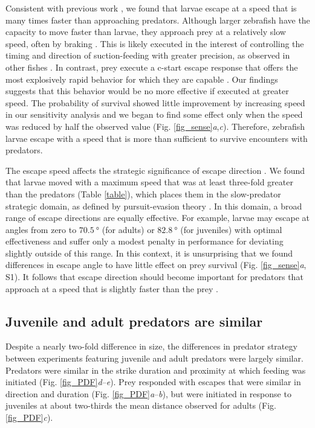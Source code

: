 \documentclass[]{rsos}%
\begin{document}
Consistent with previous work \cite{Stewart:2013bha}, we found that larvae escape at a speed that is many times faster than approaching predators.
Although larger zebrafish have the capacity to move faster than larvae, they approach prey at a relatively slow speed, often by braking \cite{McHenry:2005tc}.
This is likely executed in the interest of controlling the timing and direction of suction-feeding with greater precision, as observed in other fishes \cite{Higham:2005iu,Higham:2007go}.
In contrast, prey execute a c-start escape response that offers the most explosively rapid behavior for which they are capable \cite{Muller:2004hp}.
Our findings suggests that this behavior would be no more effective if executed at greater speed.
The probability of survival showed little improvement by increasing speed in our sensitivity analysis and we began to find some effect only when the speed was reduced by half the observed value (Fig. \ref{fig_sense}\textit{a},\textit{c}).
Therefore, zebrafish larvae escape with a speed that is more than sufficient to survive encounters with predators.

The escape speed affects the strategic significance of escape direction \cite{Isaacs:1965uz,Weihs:1984tb}.
We found that larvae moved with a maximum speed that was at least three-fold greater than the predators (Table \ref{table}), which places them in the slow-predator strategic domain, as defined by pursuit-evasion theory \cite{Soto:2015cj}.
In this domain, a broad range of escape directions are equally effective.
For example, larvae may escape at angles from zero to $\SI{70.5}{\degree}$ (for adults) or $\SI{82.8}{\degree}$ (for juveniles) with optimal effectiveness \cite{Soto:2015cj} and suffer only a modest penalty in performance for deviating slightly outside of this range. 
In this context, it is unsurprising that we found differences in escape angle to have little effect on prey survival (Fig. \ref{fig_sense}\textit{a}, S1).
It follows that escape direction should become important for predators that approach at a speed that is slightly faster than the prey \cite{Soto:2015cj}. 

\subsection{Juvenile and adult predators are similar} 

Despite a nearly two-fold difference in size, the differences in predator strategy between experiments featuring juvenile and adult predators were largely similar.
Predators were similar in the strike duration and proximity at which feeding was initiated (Fig. \ref{fig_PDF}\textit{d}--\textit{e}).
Prey responded with escapes that were similar in direction and duration (Fig. \ref{fig_PDF}\textit{a}--\textit{b}), but were initiated in response to juveniles at about two-thirds the mean distance observed for adults (Fig. \ref{fig_PDF}\textit{c}).
\end{document}
